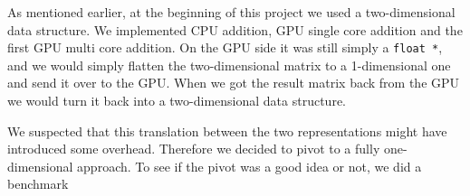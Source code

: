 As mentioned earlier, at the beginning of this project we used a two-dimensional data structure. We implemented CPU addition, GPU single core addition and the first GPU multi core addition. On the GPU side it was still simply a \texttt{float *}, and we would simply flatten the two-dimensional matrix to a 1-dimensional one and send it over to the GPU. When we got the result matrix back from the GPU we would turn it back into a two-dimensional data structure. 

We suspected that this translation between the two representations might have introduced some overhead. Therefore we decided to pivot to a fully one-dimensional approach. To see if the pivot was a good idea or not, we did a benchmark
